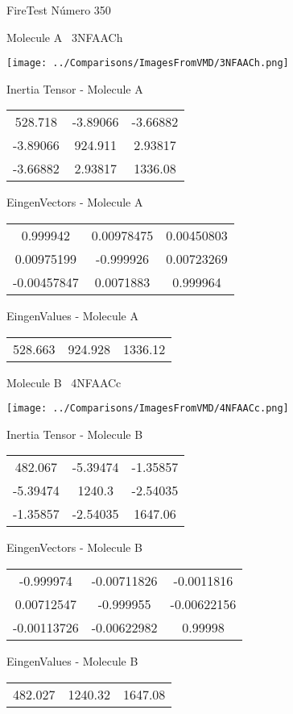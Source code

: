 \vtab[-3cm]
\begin{center}
{\large FireTest \tab Número 350}
\end{center}
\begin{multicols}{2}
\begin{center}

Molecule A \
3NFAACh

\texttt{[image: ../Comparisons/ImagesFromVMD/3NFAACh.png]}

Inertia Tensor - Molecule A \\
\begin{tabular}{|c c c|}
528.718	 & 	-3.89066	 & 	-3.66882	 \\
-3.89066	 & 	924.911	 & 	2.93817	 \\
-3.66882	 & 	2.93817	 & 	1336.08
\end{tabular}

\vtab
 EingenVectors - Molecule A     \\
\begin{tabular}{|c c c|}
0.999942	 & 	0.00978475	 & 	0.00450803	 \\
0.00975199	 & 	-0.999926	 & 	0.00723269	 \\
-0.00457847	 & 	0.0071883	 & 	0.999964
\end{tabular}

\vtab
 EingenValues - Molecule A     \\
\begin{tabular}{|c c c|}
528.663	 & 	924.928	 & 	1336.12	 \\
\end{tabular}
\columnbreak

Molecule B \
4NFAACc

\texttt{[image: ../Comparisons/ImagesFromVMD/4NFAACc.png]}

Inertia Tensor - Molecule B \\
\begin{tabular}{|c c c|}
482.067	 & 	-5.39474	 & 	-1.35857	 \\
-5.39474	 & 	1240.3	 & 	-2.54035	 \\
-1.35857	 & 	-2.54035	 & 	1647.06
\end{tabular}

\vtab
 EingenVectors - Molecule B     \\
\begin{tabular}{|c c c|}
-0.999974	 & 	-0.00711826	 & 	-0.0011816	 \\
0.00712547	 & 	-0.999955	 & 	-0.00622156	 \\
-0.00113726	 & 	-0.00622982	 & 	0.99998
\end{tabular}

\vtab
 EingenValues - Molecule B     \\
\begin{tabular}{|c c c|}
482.027	 & 	1240.32	 & 	1647.08	 \\
\end{tabular}

\end{center}
\end{multicols}

